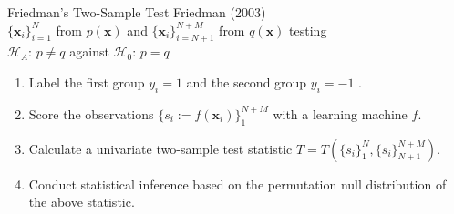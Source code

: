 \documentclass{beamer}
\begin{document}
\begin{frame}{Friedman's Two-Sample Test}
  Friedman (2003) \\
  $\{\mathbf{x}_i\}_{i=1}^N$ from $p(\mathbf{x})$ and
  $\{\mathbf{x}_i\}_{i=N+1}^{N+M}$ from $q(\mathbf{x})$ testing \\
  $\mathcal{H}_A$: $p \neq q$ against $\mathcal{H}_0$: $p = q$ \pause
  \begin{enumerate}
  \item Label the first group $y_i = 1$ and the second group $y_i = -1$ . \pause
  \item Score the observations $\{s_i := f(\mathbf{x}_i)\}_1^{N+M}$ with a learning machine $f$. \pause
  \item Calculate a univariate two-sample test statistic
    $T = T(\{s_i\}_1^N,\{s_i\}_{N+1}^{N+M})$. \pause
  \item Conduct statistical inference based on the permutation null distribution of the above
    statistic.
  \end{enumerate}
\end{frame}
\end{document}

